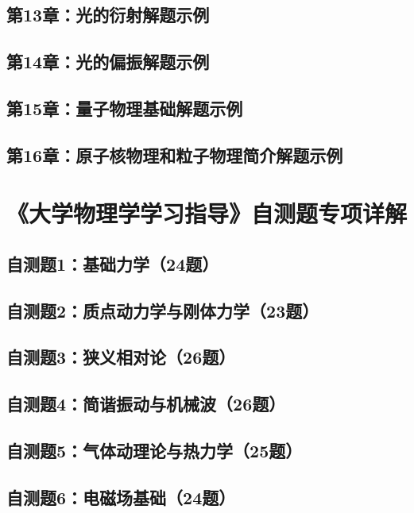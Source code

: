 \documentclass[lang=cn,color=blue,11pt]{elegantbook}
\begin{document}
\section{第13章：光的衍射解题示例}

\section{第14章：光的偏振解题示例}

\section{第15章：量子物理基础解题示例}

\section{第16章：原子核物理和粒子物理简介解题示例}



\chapter{《大学物理学学习指导》自测题专项详解}
\section{自测题1：基础力学（24题）}



\section{自测题2：质点动力学与刚体力学（23题）}



\section{自测题3：狭义相对论（26题）}



\section{自测题4：简谐振动与机械波（26题）}



\section{自测题5：气体动理论与热力学（25题）}



\section{自测题6：电磁场基础（24题）}

\end{document}
